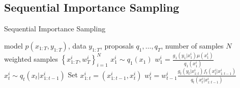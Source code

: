 \subsection{Sequential Importance Sampling}
\label{sec:part:smc:sis}

\begin{algorithm}[tb]
	\caption{Sequential Importance Sampling}
	\label{alg:part:sis}
	\begin{spacing}{1.2}
		\begin{algorithmic}[1]
			\renewcommand{\algorithmicrequire}{\textbf{Inputs:}}
			\renewcommand{\algorithmicensure}{\textbf{Outputs:}}			 
			\Require model $p(x_{1:T},y_{1:T})$, data $y_{1:T}$, proposals $q_1,\dots,q_T$, number of samples $N$
			\Ensure weighted samples $\left\{x_{1:T}^i,w_T^i\right\}_{i=1}^N$
			\State $x_1^i \sim q_1(x_1)$
			\State $w_1^i = \frac{g_1(y_1|x_1^i) \mu(x_1^i)}{q_1(x_1^i)}$
			\State $x_t^i \sim q_t(x_t | x_{1:t-1}^i)$ 
			\State Set $x_{1:t}^i = (x_{1:t-1}^{i},x_t^i)$
			\State $w_t^i = w_{t-1}^i \frac{g_t(y_t|x_{1:t}^i) f_t(x_t^i | x_{1:t-1}^{i})}{q_t(x_t^i|x_{1:t-1}^{i})}$
			\EndFor
			\EndFor
		\end{algorithmic}
	\end{spacing}
\end{algorithm}


